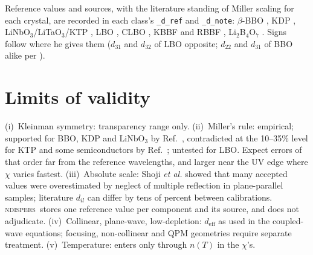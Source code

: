 \documentclass[aps,pra,preprint,amsmath,amssymb,nofootinbib,superscriptaddress]{revtex4-2}
\newcommand{\ueff}{d_{\mathrm{eff}}}
\newcommand{\ndispers}{\textsc{ndispers}}
\begin{document}
Reference values and sources, with the literature standing of Miller
scaling for each crystal, are recorded in each class's \texttt{\_d\_ref}
and \texttt{\_d\_note}: $\beta$-BBO \cite{Shoji1999}, KDP
\cite{Eckardt1990}, LiNbO$_3$/LiTaO$_3$/KTP \cite{Shoji1997}, LBO
\cite{Velsko1991,Roberts1992}, CLBO \cite{Mori1995}, KBBF and RBBF
\cite{ChenKBBF,ChenRBBF}, Li$_2$B$_4$O$_7$ \cite{Komatsu1997,Petrov1998}.
Signs follow \cite{Roberts1992} where he gives them ($d_{31}$ and $d_{32}$
of LBO opposite; $d_{22}$ and $d_{31}$ of BBO alike per
\cite{Alford2001}).

\section{Limits of validity}

(i)~Kleinman symmetry: transparency range only. (ii)~Miller's rule:
empirical; supported for BBO, KDP and LiNbO$_3$ by Ref.~\cite{Alford2001},
contradicted at the 10--35\% level for KTP and some semiconductors by
Ref.~\cite{Shoji1997}; untested for LBO. Expect errors of that order far
from the reference wavelengths, and larger near the UV edge where
$\chi$ varies fastest. (iii)~Absolute scale: Shoji \emph{et al.}
\cite{Shoji1997} showed that many accepted values were overestimated by
neglect of multiple reflection in plane-parallel samples; literature
$d_{il}$ can differ by tens of percent between calibrations. \ndispers\
stores one reference value per component and its source, and does not
adjudicate. (iv)~Collinear,
plane-wave, low-depletion: $\ueff$ as used in the coupled-wave equations;
focusing, non-collinear and QPM geometries require separate treatment.
(v)~Temperature: enters only through $n(T)$ in the $\chi$'s.
\end{document}

